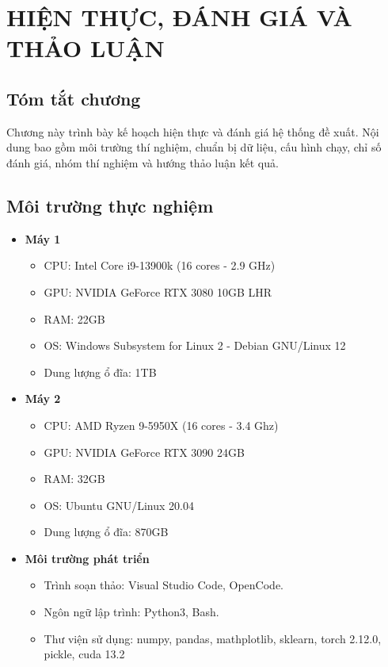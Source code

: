 \chapter{HIỆN THỰC, ĐÁNH GIÁ VÀ THẢO LUẬN}\label{Chapter4}

\section*{Tóm tắt chương}

Chương này trình bày kế hoạch hiện thực và đánh giá hệ thống đề xuất. Nội dung bao gồm môi trường thí nghiệm, chuẩn bị dữ liệu, cấu hình chạy, chỉ số đánh giá, nhóm thí nghiệm và hướng thảo luận kết quả.

\section{Môi trường thực nghiệm}

\begin{itemize}
    \item \textbf{Máy 1}
    \begin{itemize}
        \item CPU: Intel\textregistered{} Core\texttrademark{} i9-13900k (16 cores - 2.9 GHz)
        \item GPU: NVIDIA GeForce\texttrademark{} RTX 3080 10GB LHR
        \item RAM: 22GB
        \item OS: Windows Subsystem for Linux 2 - Debian GNU/Linux 12
        \item Dung lượng ổ đĩa: 1TB
    \end{itemize}
    
    \item \textbf{Máy 2}
    \begin{itemize}
        \item CPU: AMD\textregistered{} Ryzen\texttrademark{} 9-5950X (16 cores - 3.4 Ghz)
        \item GPU: NVIDIA GeForce\texttrademark{} RTX 3090 24GB
        \item RAM: 32GB
        \item OS: Ubuntu GNU/Linux 20.04
        \item Dung lượng ổ đĩa: 870GB
    \end{itemize}

    \item \textbf{Môi trường phát triển}
    \begin{itemize}
        \item Trình soạn thảo: Visual Studio Code, OpenCode.
        \item Ngôn ngữ lập trình: Python3, Bash.
        \item Thư viện sử dụng: numpy, pandas, mathplotlib, sklearn, torch 2.12.0, pickle, cuda 13.2
    \end{itemize}
\end{itemize}

